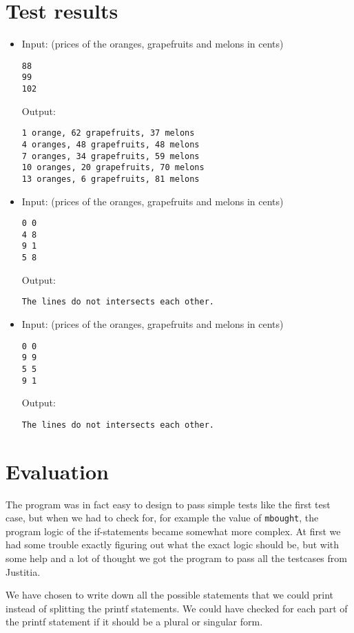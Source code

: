 \documentclass[a4paper,10pt]{article}
\begin{document}
\section{Test results}

\begin{itemize}

\item Input: (prices of the oranges, grapefruits and melons in cents)
\begin{lstlisting}[style = stdio]
88
99
102
\end{lstlisting}

  Output:
\begin{lstlisting}[style = stdio]
1 orange, 62 grapefruits, 37 melons
4 oranges, 48 grapefruits, 48 melons
7 oranges, 34 grapefruits, 59 melons
10 oranges, 20 grapefruits, 70 melons
13 oranges, 6 grapefruits, 81 melons
\end{lstlisting}


\item Input: (prices of the oranges, grapefruits and melons in cents)
\begin{lstlisting}[style = stdio]
0 0
4 8
9 1
5 8
\end{lstlisting}

  Output:
\begin{lstlisting}[style = stdio]
The lines do not intersects each other.
\end{lstlisting}


\item Input: (prices of the oranges, grapefruits and melons in cents)
\begin{lstlisting}[style = stdio]
0 0
9 9
5 5
9 1
\end{lstlisting}

  Output:
\begin{lstlisting}[style = stdio]
The lines do not intersects each other.
\end{lstlisting}

\end{itemize}

\section{Evaluation}
The program was in fact easy to design to pass simple tests like the first test case, but when we had to check for, for example the value of {\tt mbought}, the program logic of the if-statements became somewhat more complex. At first we had some trouble exactly figuring out what the exact logic should be, but with some help and a lot of thought we got the program to pass all the testcases from Justitia. 

We have chosen to write down all the possible statements that we could print instead of splitting the printf statements. We could have checked for each part of the printf statement if it should be a plural or singular form. 
\end{document}
